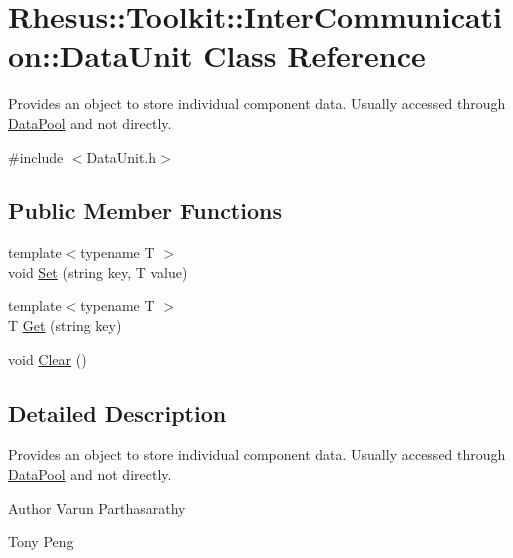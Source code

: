 \hypertarget{class_rhesus_1_1_toolkit_1_1_inter_communication_1_1_data_unit}{\section{Rhesus\-:\-:Toolkit\-:\-:Inter\-Communication\-:\-:Data\-Unit Class Reference}
\label{class_rhesus_1_1_toolkit_1_1_inter_communication_1_1_data_unit}
}


Provides an object to store individual component data. Usually accessed through \hyperlink{class_rhesus_1_1_toolkit_1_1_inter_communication_1_1_data_pool}{Data\-Pool} and not directly.  




{\ttfamily \#include $<$Data\-Unit.\-h$>$}

\subsection*{Public Member Functions}
\begin{DoxyCompactItemize}
\item 
{\footnotesize template$<$typename T $>$ }\\void \hyperlink{class_rhesus_1_1_toolkit_1_1_inter_communication_1_1_data_unit_a61bcf14dd855aee0c4710bee53c393b2}{Set} (string key, T value)
\item 
{\footnotesize template$<$typename T $>$ }\\T \hyperlink{class_rhesus_1_1_toolkit_1_1_inter_communication_1_1_data_unit_a2e7b9a5c7d0fc381085456eded846cc5}{Get} (string key)
\item 
void \hyperlink{class_rhesus_1_1_toolkit_1_1_inter_communication_1_1_data_unit_a9e49e0086e134e98cb097746bbcd82d5}{Clear} ()
\end{DoxyCompactItemize}


\subsection{Detailed Description}
Provides an object to store individual component data. Usually accessed through \hyperlink{class_rhesus_1_1_toolkit_1_1_inter_communication_1_1_data_pool}{Data\-Pool} and not directly. 

\begin{DoxyAuthor}{Author}
Varun Parthasarathy 

Tony Peng 
\end{DoxyAuthor}


